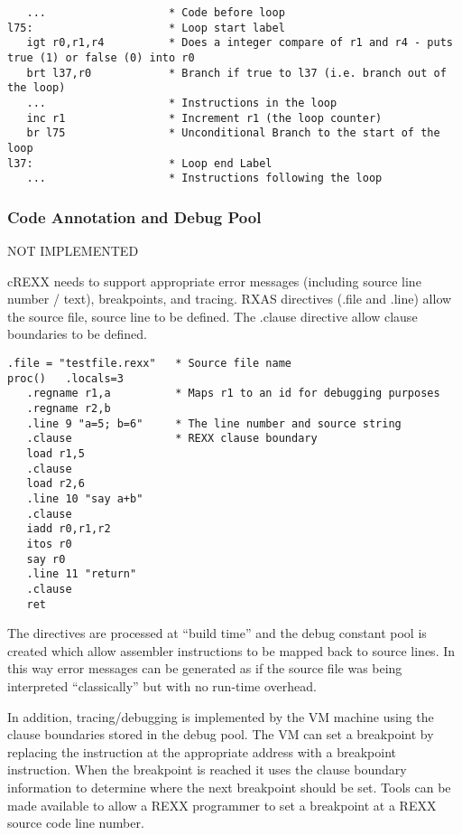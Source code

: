 \begin{verbatim}
   ...                   * Code before loop
l75:                     * Loop start label
   igt r0,r1,r4          * Does a integer compare of r1 and r4 - puts true (1) or false (0) into r0
   brt l37,r0            * Branch if true to l37 (i.e. branch out of the loop)
   ...                   * Instructions in the loop
   inc r1                * Increment r1 (the loop counter)
   br l75                * Unconditional Branch to the start of the loop
l37:                     * Loop end Label 
   ...                   * Instructions following the loop
\end{verbatim}

\hypertarget{code-annotation-and-debug-pool}{%
\subsubsection{Code Annotation and Debug
Pool}\label{code-annotation-and-debug-pool}}

NOT IMPLEMENTED

cREXX needs to support appropriate error messages (including source line
number / text), breakpoints, and tracing. RXAS directives (.file and
.line) allow the source file, source line to be defined. The .clause
directive allow clause boundaries to be defined.

\begin{verbatim}
.file = "testfile.rexx"   * Source file name 
proc()   .locals=3
   .regname r1,a          * Maps r1 to an id for debugging purposes 
   .regname r2,b
   .line 9 "a=5; b=6"     * The line number and source string
   .clause                * REXX clause boundary
   load r1,5
   .clause
   load r2,6
   .line 10 "say a+b"
   .clause
   iadd r0,r1,r2
   itos r0
   say r0
   .line 11 "return"
   .clause
   ret
\end{verbatim}

The directives are processed at ``build time'' and the debug constant
pool is created which allow assembler instructions to be mapped back to
source lines. In this way error messages can be generated as if the
source file was being interpreted ``classically'' but with no run-time
overhead.

In addition, tracing/debugging is implemented by the VM machine using
the clause boundaries stored in the debug pool. The VM can set a
breakpoint by replacing the instruction at the appropriate address with
a breakpoint instruction. When the breakpoint is reached it uses the
clause boundary information to determine where the next breakpoint
should be set. Tools can be made available to allow a REXX programmer to
set a breakpoint at a REXX source code line number.

